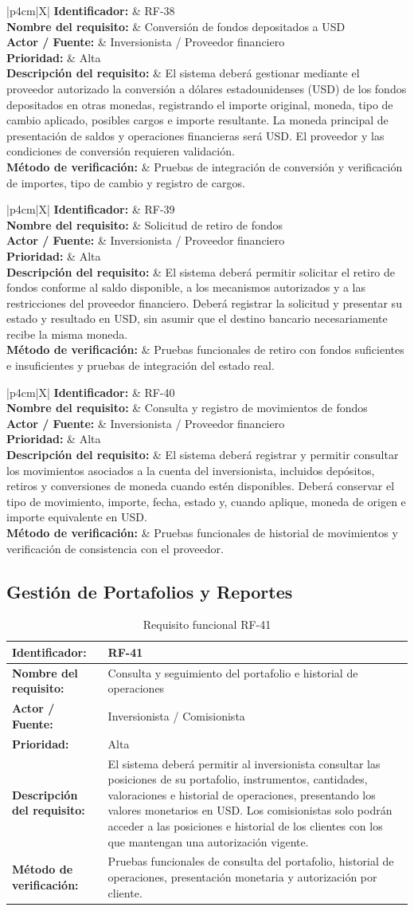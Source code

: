 \documentclass[11pt,a4paper,oneside]{article}
\newcommand{\tablaRequisito}[6]{%
\begin{table}[H]
\centering
\begin{tabularx}{\linewidth}{|p{4cm}|X|}
\hline
\textbf{Identificador:} & #1 \\ \hline
\textbf{Nombre del requisito:} & #2 \\ \hline
\textbf{Actor / Fuente:} & #3 \\ \hline
\textbf{Prioridad:} & #4 \\ \hline
\textbf{Descripción del requisito:} &
#5 \\ \hline
\textbf{Método de verificación:} & #6 \\ \hline
\end{tabularx}
\caption{Requisito funcional #1}
\label{tab:#1}
\end{table}
}
\begin{document}
\tablaRequisito
{RF-38}
{Conversión de fondos depositados a USD}
{Inversionista / Proveedor financiero}
{Alta}
{El sistema deberá gestionar mediante el proveedor autorizado la conversión a dólares estadounidenses (USD) de los fondos depositados en otras monedas, registrando el importe original, moneda, tipo de cambio aplicado, posibles cargos e importe resultante. La moneda principal de presentación de saldos y operaciones financieras será USD. El proveedor y las condiciones de conversión requieren validación.}
{Pruebas de integración de conversión y verificación de importes, tipo de cambio y registro de cargos.}


\tablaRequisito
{RF-39}
{Solicitud de retiro de fondos}
{Inversionista / Proveedor financiero}
{Alta}
{El sistema deberá permitir solicitar el retiro de fondos conforme al saldo disponible, a los mecanismos autorizados y a las restricciones del proveedor financiero. Deberá registrar la solicitud y presentar su estado y resultado en USD, sin asumir que el destino bancario necesariamente recibe la misma moneda.}
{Pruebas funcionales de retiro con fondos suficientes e insuficientes y pruebas de integración del estado real.}


\tablaRequisito
{RF-40}
{Consulta y registro de movimientos de fondos}
{Inversionista / Proveedor financiero}
{Alta}
{El sistema deberá registrar y permitir consultar los movimientos asociados a la cuenta del inversionista, incluidos depósitos, retiros y conversiones de moneda cuando estén disponibles. Deberá conservar el tipo de movimiento, importe, fecha, estado y, cuando aplique, moneda de origen e importe equivalente en USD.}
{Pruebas funcionales de historial de movimientos y verificación de consistencia con el proveedor.}


\subsection{Gestión de Portafolios y Reportes}

\tablaRequisito
{RF-41}
{Consulta y seguimiento del portafolio e historial de operaciones}
{Inversionista / Comisionista}
{Alta}
{El sistema deberá permitir al inversionista consultar las posiciones de su portafolio, instrumentos, cantidades, valoraciones e historial de operaciones, presentando los valores monetarios en USD. Los comisionistas solo podrán acceder a las posiciones e historial de los clientes con los que mantengan una autorización vigente.}
{Pruebas funcionales de consulta del portafolio, historial de operaciones, presentación monetaria y autorización por cliente.}
\end{document}
